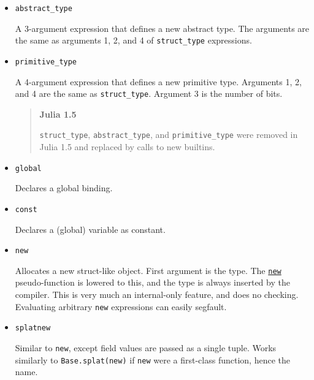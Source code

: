\begin{itemize}
\begin{itemize}
\item \texttt{args[6]}

A Bool, true if \texttt{mutable}


\item \texttt{args[7]}

The number of arguments to initialize. This will be the number of fields, or the minimum number of fields called by an inner constructor{\textquotesingle}s \texttt{new} statement.

\end{itemize}

\item \texttt{abstract\_type}

A 3-argument expression that defines a new abstract type. The arguments are the same as arguments 1, 2, and 4 of \texttt{struct\_type} expressions.


\item \texttt{primitive\_type}

A 4-argument expression that defines a new primitive type. Arguments 1, 2, and 4 are the same as \texttt{struct\_type}. Argument 3 is the number of bits.

\begin{quote}
\textbf{Julia 1.5}

\texttt{struct\_type}, \texttt{abstract\_type}, and \texttt{primitive\_type} were removed in Julia 1.5 and replaced by calls to new builtins.

\end{quote}

\item \texttt{global}

Declares a global binding.


\item \texttt{const}

Declares a (global) variable as constant.


\item \texttt{new}

Allocates a new struct-like object. First argument is the type. The \hyperlink{13888762393600028594}{\texttt{new}} pseudo-function is lowered to this, and the type is always inserted by the compiler.  This is very much an internal-only feature, and does no checking. Evaluating arbitrary \texttt{new} expressions can easily segfault.


\item \texttt{splatnew}

Similar to \texttt{new}, except field values are passed as a single tuple. Works similarly to \texttt{Base.splat(new)} if \texttt{new} were a first-class function, hence the name.



\end{itemize}
